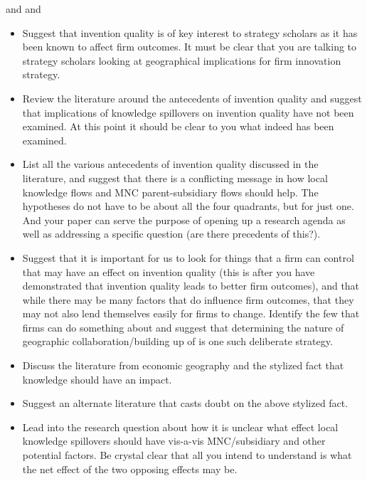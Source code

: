 \documentclass[12pt,letterpaper]{article}
\begin{document}
\cite{Burt1992} and \cite{Winter1995} and \cite{Clark2008}
\begin{itemize}
\item Suggest that invention quality is of key interest to strategy scholars as it has been known to affect firm outcomes. It must be clear that you are talking to strategy scholars looking at geographical implications for firm innovation strategy.

\item Review the literature around the antecedents of invention quality and suggest that implications of knowledge spillovers on invention quality have not been examined. At this point it should be clear to you what indeed has been examined.

\item List all the various antecedents of invention quality discussed in the literature, and suggest that there is a conflicting message in how local knowledge flows and MNC parent-subsidiary flows should help. The hypotheses do not have to be about all the four quadrants, but for just one. And your paper can serve the purpose of opening up a research agenda as well as addressing a specific question (are there precedents of this?).

\item Suggest that it is important for us to look for things that a firm can control that may have an effect on invention quality (this is after you have demonstrated that invention quality leads to better firm outcomes), and that while there may be many factors that do influence firm outcomes, that they may not also lend themselves easily for firms to change. Identify the few that firms can do something about and suggest that determining the nature of geographic collaboration/building up of is one such deliberate strategy.

\item Discuss the literature from economic geography and the stylized fact that knowledge should have an impact. 

\item Suggest an alternate literature that casts doubt on the above stylized fact.

\item Lead into the research question about how it is unclear what effect local knowledge spillovers should have vis-a-vis MNC/subsidiary and other potential factors. Be crystal clear that all you intend to understand is what the net effect of the two opposing effects may be.


\end{itemize}
\end{document}
